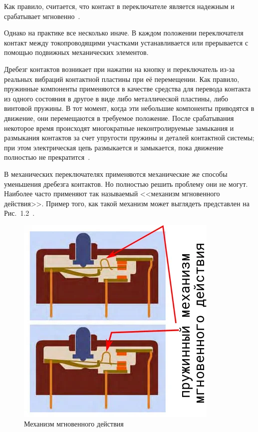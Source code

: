 \documentclass{altsu-report}
\begin{document}
Как правило, считается, что контакт в переключателе является надежным и срабатывает мгновенно~\cite{sym}.

Однако на практике все несколько иначе. В каждом положении переключателя контакт между токопроводящими участками устанавливается или прерывается с помощью подвижных механических элементов.

Дребезг контактов возникает при нажатии на кнопку и переключатель из-за реальных вибраций контактной пластины при её перемещении. Как правило, пружинные компоненты применяются в качестве средства для перевода контакта из одного состояния в другое в виде либо металлической пластины, либо винтовой пружины. В тот момент, когда эти небольшие компоненты приводятся в движение, они перемещаются в требуемое положение. После срабатывания некоторое время происходят многократные неконтролируемые замыкания и размыкания контактов за счет упругости пружины и деталей контактной системы; при этом электрическая цепь размыкается и замыкается, пока движение полностью не прекратится~\cite{samel}.

В механических переключателях применяются механические же способы уменьшения дребезга контактов. Но полностью решить проблему они не могут. Наиболее часто применяют так называемый <<механизм мгновенного действия>>. Пример того, как такой механизм может выглядеть представлен на Рис.~1.2~\cite{dzen}.

\begin{figure}[H]
    \centering
    \includegraphics[scale=1.2]{instant_action.png}
    \caption{Механизм мгновенного действия}
    \label{fig:instant_action}
\end{figure}
\end{document}
